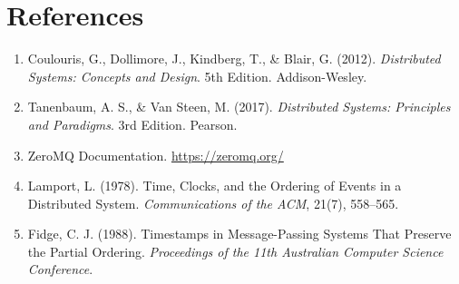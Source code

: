 \documentclass[12pt,a4paper]{article}
\begin{document}
\section{References}

\begin{enumerate}
    \item Coulouris, G., Dollimore, J., Kindberg, T., \& Blair, G. (2012). \textit{Distributed Systems: Concepts and Design}. 5th Edition. Addison-Wesley.
    \item Tanenbaum, A. S., \& Van Steen, M. (2017). \textit{Distributed Systems: Principles and Paradigms}. 3rd Edition. Pearson.
    \item ZeroMQ Documentation. \url{https://zeromq.org/}
    \item Lamport, L. (1978). Time, Clocks, and the Ordering of Events in a Distributed System. \textit{Communications of the ACM}, 21(7), 558--565.
    \item Fidge, C. J. (1988). Timestamps in Message-Passing Systems That Preserve the Partial Ordering. \textit{Proceedings of the 11th Australian Computer Science Conference}.
\end{enumerate}
\end{document}
